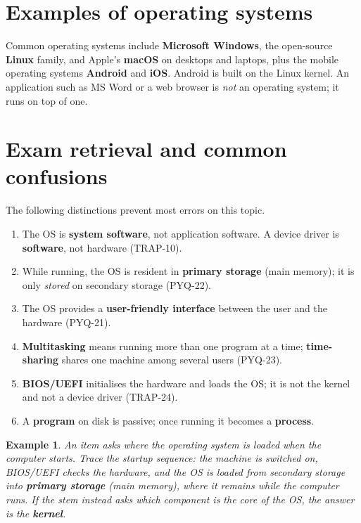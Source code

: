 \documentclass[11pt]{article}
\newtheorem{example}{Example}[section]
\begin{document}
\section{Examples of operating systems}
Common operating systems include \textbf{Microsoft Windows}, the open-source
\textbf{Linux} family, and Apple's \textbf{macOS} on desktops and laptops, plus
the mobile operating systems \textbf{Android} and \textbf{iOS}. Android is
built on the Linux kernel. An application such as MS Word or a web browser is
\emph{not} an operating system; it runs on top of one.

\section{Exam retrieval and common confusions}
The following distinctions prevent most errors on this topic.
\begin{enumerate}
  \item The OS is \textbf{system software}, not application software. A device
    driver is \textbf{software}, not hardware (TRAP-10).
  \item While running, the OS is resident in \textbf{primary storage} (main
    memory); it is only \emph{stored} on secondary storage (PYQ-22).
  \item The OS provides a \textbf{user-friendly interface} between the user and
    the hardware (PYQ-21).
  \item \textbf{Multitasking} means running more than one program at a time;
    \textbf{time-sharing} shares one machine among several users (PYQ-23).
  \item \textbf{BIOS/UEFI} initialises the hardware and loads the OS; it is not
    the kernel and not a device driver (TRAP-24).
  \item A \textbf{program} on disk is passive; once running it becomes a
    \textbf{process}.
\end{enumerate}

\begin{example}
An item asks where the operating system is loaded when the computer starts.
Trace the startup sequence: the machine is switched on, BIOS/UEFI checks the
hardware, and the OS is loaded from secondary storage into \textbf{primary
storage} (main memory), where it remains while the computer runs. If the stem
instead asks which component is the core of the OS, the answer is the
\textbf{kernel}.
\end{example}
\end{document}
